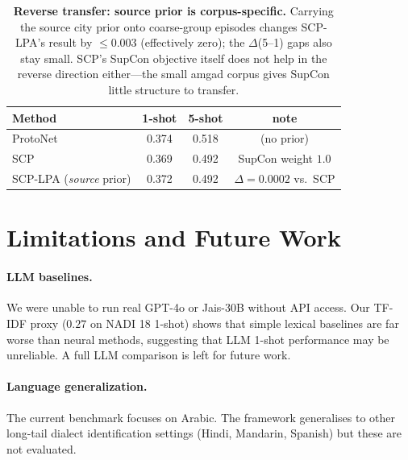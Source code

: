 \documentclass[11pt,a4paper]{article}
\begin{document}
\begin{table}[t]
\centering\scriptsize
\begin{tabular}{lccc}
\toprule
Method & 1-shot & 5-shot & note \\
\midrule
ProtoNet                       & 0.374 & 0.518 & (no prior) \\
SCP                            & 0.369 & 0.492 & SupCon weight $1.0$ \\
SCP-LPA (\emph{source} prior) & 0.372 & 0.492 & $\Delta{=}0.0002$ vs.\ SCP \\
\bottomrule
\end{tabular}
\caption{\textbf{Reverse transfer: source prior is corpus-specific.}
Carrying the source city prior onto coarse-group episodes changes
SCP-LPA's result by $\le 0.003$ (effectively zero); the
$\Delta$(5--1) gaps also stay small. SCP's SupCon objective
itself does not help in the reverse direction either---the
small amgad corpus gives SupCon little structure to transfer.}
\label{tab:A8-reverse}
\end{table}

\section{Limitations and Future Work}
\paragraph{LLM baselines.} We were unable to run real GPT-4o or Jais-30B
without API access. Our TF-IDF proxy ($0.27$ on NADI 18 1-shot)
shows that simple lexical baselines are far worse than neural
methods, suggesting that LLM 1-shot performance may be unreliable.
A full LLM comparison is left for future work.

\paragraph{Language generalization.} The current benchmark focuses on
Arabic. The framework generalises to other long-tail dialect
identification settings (Hindi, Mandarin, Spanish) but these are
not evaluated.
\end{document}
